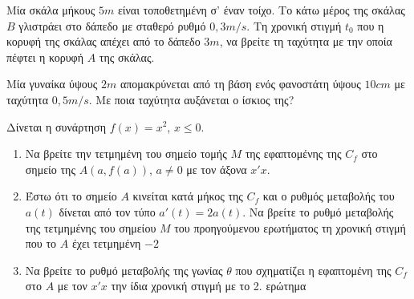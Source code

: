 \documentclass{presentation}
\begin{document}
\begin{askisi}
  Μία σκάλα μήκους $5m$ είναι τοποθετημένη σ' έναν τοίχο. Το κάτω μέρος της σκάλας $Β$ γλιστράει στο δάπεδο με σταθερό ρυθμό $0,3m/s$. Τη χρονική στιγμή $t_0$ που η κορυφή της σκάλας απέχει από το δάπεδο $3m$, να βρείτε τη ταχύτητα με την οποία πέφτει η κορυφή $Α$ της σκάλας.

\end{askisi}

\begin{askisi}
  Μία γυναίκα ύψους $2m$ απομακρύνεται από τη βάση ενός φανοστάτη ύψους $10cm$ με ταχύτητα $0,5m/s$. Με ποια ταχύτητα αυξάνεται ο ίσκιος της?

\end{askisi}

\begin{askisi}
  Δίνεται η συνάρτηση $f(x)=x^2$, $x\le 0$.
  \begin{enumerate}
    \item<1-> Να βρείτε την τετμημένη του σημείο τομής $Μ$ της εφαπτομένης της $C_f$ στο σημείο της $Α(a,f(a))$, $a\ne 0$ με τον άξονα $x'x$.
    \item<2-> Έστω ότι το σημείο $Α$ κινείται κατά μήκος της $C_f$ και ο ρυθμός μεταβολής του $a(t)$ δίνεται από τον τύπο $a'(t)=2a(t)$. Να βρείτε το ρυθμό μεταβολής της τετμημένης του σημείου $Μ$ του προηγούμενου ερωτήματος τη χρονική στιγμή που το $Α$ έχει τετμημένη $-2$
    \item<3-> Να βρείτε το ρυθμό μεταβολής της γωνίας $θ$ που σχηματίζει η εφαπτομένη της $C_f$ στο $Α$ με τον $x'x$ την ίδια χρονική στιγμή με το 2. ερώτημα
  \end{enumerate}

\end{askisi}

\moodle
\end{document}
